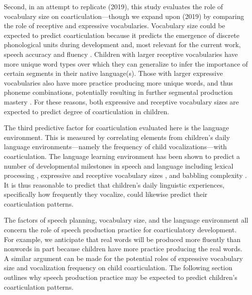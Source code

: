 \documentclass[a4paper,man,natbib,donotrepeattitle, apacite]{apa6}
\begin{document}
Second, in an attempt to replicate \citeauthor{noiraySpokenLanguageDevelopment2019} (2019), this study evaluates the role of vocabulary size on coarticulation---though we expand upon \citeauthor{noiraySpokenLanguageDevelopment2019} (2019) by comparing the role of receptive and expressive vocabularies. Vocabulary size could be expected to predict coarticulation because it predicts the emergence of discrete phonological units during development \cite{edwardsInteractionVocabularySize2004,sosaLexicalPhonologicalEffects2012,stoel-gammonRelationshipsLexicalPhonological2011,storkelLexiconPhonologyInteractions2002} and, most relevant for the current work, speech accuracy and fluency \cite{cychoszLexicalAdvantageFouryearold2020,edwardsInteractionVocabularySize2004,metsalaYoungChildrenPhonological1999,munsonRelationshipsNonwordRepetition2005,zamunerPhonotacticProbabilitiesOnset2009}. Children with larger receptive vocabularies have more unique word types over which they can generalize to infer the importance of certain segments in their native language(s). Those with larger expressive vocabularies also have more practice producing more unique words, and thus phoneme combinations, potentially resulting in further segmental production mastery \cite{beckmanGeneralizingLexiconsPredict2010}. For these reasons, both expressive and receptive vocabulary sizes are expected to predict degree of coarticulation in children. 

The third predictive factor for coarticulation evaluated here is the language environment. This is measured by correlating elements from children’s daily language environments---namely the frequency of child vocalizations---with coarticulation. The language learning environment has been shown to predict a number of developmental milestones in speech and language including lexical processing \cite{weislederTalkingChildrenMatters2013}, expressive and receptive vocabulary sizes \cite{hartMeaningfulDifferencesEveryday1995,hoffSpecificityEnvironmentalInfluence2003,mahrUsingLanguageInput2018}, and babbling complexity \cite{ferjanramirezParentCoaching102019}. It is thus reasonable to predict that children’s daily linguistic experiences, specifically how frequently they vocalize, could likewise predict their coarticulation patterns. 

The factors of speech planning, vocabulary size, and the language environment all concern the role of speech production practice for coarticulatory development. For example, we anticipate that real words will be produced more fluently than nonwords in part because children have more practice producing the real words. A similar argument can be made for the potential roles of expressive vocabulary size and vocalization frequency on child coarticulation. The following section outlines why speech production practice may be expected to predict children’s coarticulation patterns. 
\end{document}
